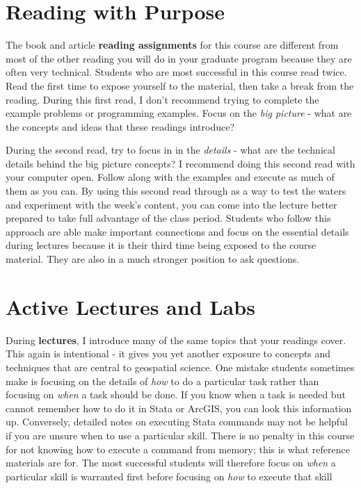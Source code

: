 \documentclass[]{book}
\theoremstyle{definition}
\theoremstyle{definition}
\theoremstyle{remark}
\begin{document}
\section{Reading with Purpose}\label{reading-with-purpose}

The book and article \textbf{reading assignments} for this course are
different from most of the other reading you will do in your graduate
program because they are often very technical. Students who are most
successful in this course read twice. Read the first time to expose
yourself to the material, then take a break from the reading. During
this first read, I don't recommend trying to complete the example
problems or programming examples. Focus on the \emph{big picture} - what
are the concepts and ideas that these readings introduce?

During the second read, try to focus in in the \emph{details} - what are
the technical details behind the big picture concepts? I recommend doing
this second read with your computer open. Follow along with the examples
and execute as much of them as you can. By using this second read
through as a way to test the waters and experiment with the week's
content, you can come into the lecture better prepared to take full
advantage of the class period. Students who follow this approach are
able make important connections and focus on the essential details
during lectures because it is their third time being exposed to the
course material. They are also in a much stronger position to ask
questions.

\section{Active Lectures and Labs}\label{active-lectures-and-labs}

During \textbf{lectures}, I introduce many of the same topics that your
readings cover. This again is intentional - it gives you yet another
exposure to concepts and techniques that are central to geospatial
science. One mistake students sometimes make is focusing on the details
of \emph{how} to do a particular task rather than focusing on
\emph{when} a task should be done. If you know when a task is needed but
cannot remember how to do it in Stata or ArcGIS, you can look this
information up. Conversely, detailed notes on executing Stata commands
may not be helpful if you are unsure when to use a particular skill.
There is no penalty in this course for not knowing how to execute a
command from memory; this is what reference materials are for. The most
successful students will therefore focus on \emph{when} a particular
skill is warranted first before focusing on \emph{how} to execute that
skill
\end{document}
